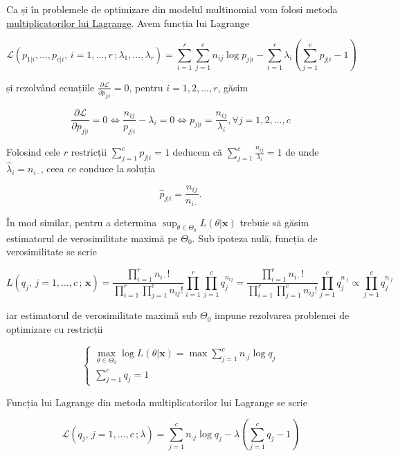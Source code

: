 \documentclass[]{article}
\begin{document}
Ca și în problemele de optimizare din modelul multinomial vom folosi
metoda
\href{https://en.wikipedia.org/wiki/Lagrange_multiplier}{multiplicatorilor
lui Lagrange}. Avem funcția lui Lagrange

\[
\mathcal{L}(p_{1|i},\ldots, p_{c|i},\,i = 1,\ldots, r\,;\lambda_1,\ldots,\lambda_r) = \sum_{i = 1}^{r}\sum_{j = 1}^{c}n_{ij}\log{p_{j|i}} - \sum_{i = 1}^{r}\lambda_i\left(\sum_{j = 1}^{c}p_{j|i} - 1\right)
\]

și rezolvând ecuațiile
\(\frac{\partial \mathcal{L}}{\partial p_{j|i}} = 0\), pentru
\(i = 1,2,\ldots,r\), găsim

\[
\frac{\partial \mathcal{L}}{\partial p_{j|i}} = 0 \iff \frac{n_{ij}}{p_{j|i}} - \lambda_i = 0 \iff p_{j|i} = \frac{n_{ij}}{\lambda_i},\forall j = 1,2,\ldots,c
\]

Folosind cele \(r\) restricții \(\sum_{j = 1}^{c}p_{j|i} = 1\) deducem
că \(\sum_{j = 1}^{c}\frac{n_{ij}}{\lambda_i} = 1\) de unde
\(\hat{\lambda}_i = n_{i\cdot}\), ceea ce conduce la soluția

\[
  \boxed{\hat{p}_{j|i} = \frac{n_{ij}}{n_{i\cdot}}}.
\]

În mod similar, pentru a determina
\(\sup_{\theta\in\Theta_0}L(\theta|\mathbf{x})\) trebuie să găsim
estimatorul de verosimilitate maximă pe \(\Theta_0\). Sub ipoteza nulă,
funcția de verosimilitate se scrie

\[
L(q_{j},\, j = 1,\ldots,c\,;\,\mathbf{x}) = \frac{\prod_{i = 1}^{r}n_{i\cdot}!}{\prod_{i = 1}^{r}\prod_{j = 1}^{c} n_{ij}!}\prod_{i = 1}^{r}\prod_{j = 1}^{c} q_{j}^{n_{ij}} = \frac{\prod_{i = 1}^{r}n_{i\cdot}!}{\prod_{i = 1}^{r}\prod_{j = 1}^{c} n_{ij}!}\prod_{j = 1}^{c} q_{j}^{n_{\cdot j}}\propto \prod_{j = 1}^{c} q_{j}^{n_{\cdot j}}
\]

iar estimatorul de verosimilitate maximă sub \(\Theta_0\) impune
rezolvarea problemei de optimizare cu restricții

\[
  \left\{\begin{array}{ll}
    \max_{\theta\in\Theta_0} \log L(\theta|\mathbf{x}) = \max \sum_{j = 1}^{c}n_{\cdot j}\log{q_{j}}\\
    \sum_{j = 1}^{c}q_{j} = 1
  \end{array}\right.
\]

Funcția lui Lagrange din metoda multiplicatorilor lui Lagrange se scrie

\[
\mathcal{L}(q_{j},\, j = 1,\ldots,c\,;\lambda) = \sum_{j = 1}^{c}n_{\cdot j}\log{q_{j}} - \lambda\left(\sum_{j = 1}^{c}q_{j} - 1\right)
\]
\end{document}
